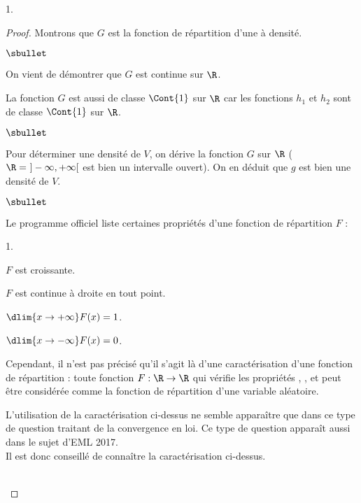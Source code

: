 \begin{noliste}{1.}
\begin{proof}
  
  \newpage


  \noindent
  Montrons que $G$ est la fonction de répartition d'une \var à
  densité.
  \begin{noliste}{$\sbullet$}
  \item On vient de démontrer que $G$ est continue sur $\R$.
  \item La fonction $G$ est aussi de classe $\Cont{1}$ sur $\R$ car
    les fonctions $h_1$ et $h_2$ sont de classe $\Cont{1}$ sur $\R$.
  \end{noliste}

\begin{noliste}{$\sbullet$}  
\item Pour déterminer une densité de $V$, on dérive la fonction $G$
  sur $\R$ ($\R = \ ]-\infty,+\infty[$ est bien un intervalle ouvert).
  On en déduit que $g$ est bien une densité de $V$.
 \end{noliste}
\begin{remark}%
  \begin{noliste}{$\sbullet$}
  \item Le programme officiel liste certaines propriétés d'une fonction de
    répartition $F$ :
    \begin{noliste}{\scriptsize 1.}
    \item $F$ est croissante.
    \item $F$ est continue à droite en tout point.
    \item $\dlim{x\to+\infty} F(x)=1$.
    \item $\dlim{x\to-\infty} F(x)=0$.
    \end{noliste}
    Cependant, il n'est pas précisé qu'il s'agit là d'une
    caractérisation d'une fonction de répartition : toute fonction $F
    : \R \to \R$ qui vérifie les propriétés , ,
     et  peut être considérée comme la fonction de
    répartition d'une variable aléatoire.

  \item L'utilisation de la caractérisation ci-dessus ne semble
    apparaître que dans ce type de question traitant de la convergence
    en loi. Ce type de question apparaît aussi dans le sujet d'EML
    2017.\\
    Il est donc conseillé de connaître la caractérisation ci-dessus.
  \end{noliste}
 \end{remark}~\\[-1.3cm]
\end{proof}

\end{noliste} 

